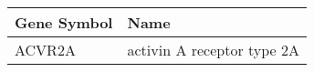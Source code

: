 \begin{tabular}{ll}
\toprule
Gene Symbol &                       Name \\
\midrule
     ACVR2A & activin A receptor type 2A \\
\bottomrule
\end{tabular}
